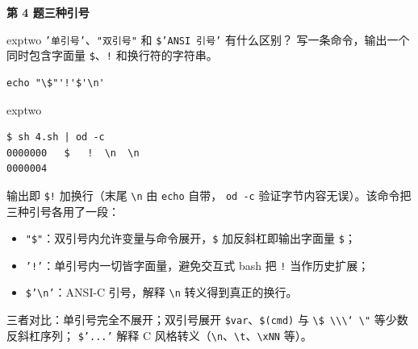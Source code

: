 \documentclass[11pt,a4paper,fontset=none]{ctexart}
\newcommand{\hwbanner}[3]{%
  \par\vspace{1.1em}
  \begin{tcolorbox}[enhanced, colback=#1!8, colframe=#1!75!black,
    boxrule=0.8pt, arc=2pt, left=7pt, right=7pt, top=4pt, bottom=4pt,
    before skip=1.1em]
    {\bfseries\color{#1!75!black}#2\qquad #3}
  \end{tcolorbox}
  \par\vspace{0.1em}\noindent\ignorespaces
}
\newcommand{\sublabel}[2]{%
  \par\vspace{0.8em}\noindent{\bfseries\color{#1!75!black}#2}\par\nobreak\vspace{0.25em}\noindent\ignorespaces
}
\begin{document}
\hwbanner{exptwo}{第 4 题}{三种引号}
\begin{reqbox}{exptwo}
  \texttt{'单引号'}、\texttt{"双引号"} 和 \texttt{\$'ANSI 引号'} 有什么区别？
  写一条命令，输出一个同时包含字面量 \texttt{\$}、\texttt{!} 和换行符的字符串。
\end{reqbox}
\sublabel{exptwo}{\faCode\ 解答（\texttt{4.sh}）}
\begin{lstlisting}[style=shell]
echo "\$"'!'$'\n'
\end{lstlisting}
\begin{resbox}{exptwo}
\begin{lstlisting}[style=output]
$ sh 4.sh | od -c
0000000   $   !  \n  \n
0000004
\end{lstlisting}
输出即 \texttt{\$!} 加换行（末尾 \texttt{\textbackslash n} 由 \texttt{echo} 自带，
\texttt{od -c} 验证字节内容无误）。该命令把三种引号各用了一段：
\begin{itemize}[leftmargin=1.4em, itemsep=1pt]
  \item \texttt{"\$"}：双引号内允许变量与命令展开，\texttt{\$} 加反斜杠即输出字面量 \texttt{\$}；
  \item \texttt{'!'}：单引号内一切皆字面量，避免交互式 bash 把 \texttt{!} 当作历史扩展；
  \item \texttt{\$'\textbackslash n'}：ANSI-C 引号，解释 \texttt{\textbackslash n} 转义得到真正的换行。
\end{itemize}
三者对比：单引号完全不展开；双引号展开 \texttt{\$var}、\texttt{\$(cmd)} 与
\texttt{\textbackslash\$ \textbackslash\textbackslash \textbackslash` \textbackslash"} 等少数反斜杠序列；
\texttt{\$'...'} 解释 C 风格转义（\texttt{\textbackslash n}、\texttt{\textbackslash t}、\texttt{\textbackslash xNN} 等）。
\end{resbox}
\end{document}
